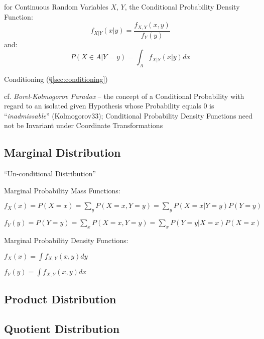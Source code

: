 for Continuous Random Variables $X$, $Y$, the Conditional Probability Density
Function:
\[
  f_{X|Y}(x|y) = \frac{f_{X,Y}(x,y)}{f_Y(y)}
\]
and:
\[
  P(X \in A| Y = y) = \int_A f_{X|Y}(x|y) dx
\]

\fist Conditioning (\S\ref{sec:conditioning})

cf. \emph{Borel-Kolmogorov Paradox} -- the concept of a Conditional Probability
with regard to an isolated given Hypothesis whose Probability equals $0$ is
``\emph{inadmissable}'' (Kolmogorov33); Conditional Probability Density
Functions need not be Invariant under Coordinate Transformations



\subsection{Marginal Distribution}\label{sec:marginal_distribution}

``Un-conditional Distribution''

Marginal Probability Mass Functions:

$f_X(x) = P(X = x) = \sum_y P(X = x, Y = y) = \sum_y P(X = x | Y = y) P(Y = y)$

$f_Y(y) = P(Y = y) = \sum_x P(X = x, Y = y) = \sum_x P(Y = y | X = x) P(X = x)$

Marginal Probability Density Functions:

$f_X(x) = \int f_{X,Y}(x,y) dy$

$f_Y(y) = \int f_{X,Y}(x,y) dx$



\subsection{Product Distribution}\label{sec:product_distribution}

\subsection{Quotient Distribution}\label{sec:quotient_distribution}

